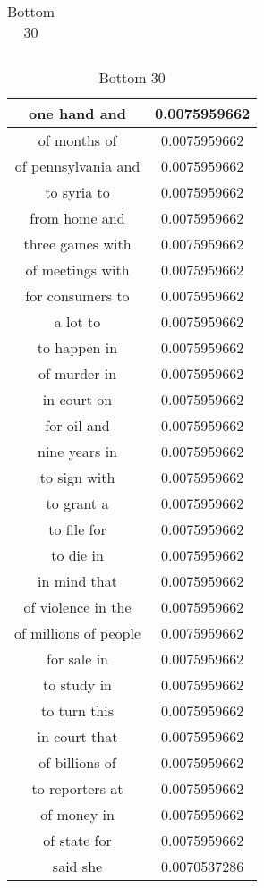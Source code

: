 \documentclass{article}
\begin{document}
\begin{table}[ht]
{\begin{tabular}{|c|c|}
\hline
\end{tabular}
\caption{Mid 30}
}
\hfill
\parbox{.23\linewidth}{
\centering
\begin{tabular}{|c|c|}
\hline
one hand and & 0.0075959662\\
\hline
of months of & 0.0075959662\\
\hline
of pennsylvania and & 0.0075959662\\
\hline
to syria to & 0.0075959662\\
\hline
from home and & 0.0075959662\\
\hline
three games with & 0.0075959662\\
\hline
of meetings with & 0.0075959662\\
\hline
for consumers to & 0.0075959662\\
\hline
a lot to & 0.0075959662\\
\hline
to happen in & 0.0075959662\\
\hline
of murder in & 0.0075959662\\
\hline
in court on & 0.0075959662\\
\hline
for oil and & 0.0075959662\\
\hline
nine years in & 0.0075959662\\
\hline
to sign with & 0.0075959662\\
\hline
to grant a & 0.0075959662\\
\hline
to file for & 0.0075959662\\
\hline
to die in & 0.0075959662\\
\hline
in mind that & 0.0075959662\\
\hline
of violence in the & 0.0075959662\\
\hline
of millions of people & 0.0075959662\\
\hline
for sale in & 0.0075959662\\
\hline
to study in & 0.0075959662\\
\hline
to turn this & 0.0075959662\\
\hline
in court that & 0.0075959662\\
\hline
of billions of & 0.0075959662\\
\hline
to reporters at & 0.0075959662\\
\hline
of money in & 0.0075959662\\
\hline
of state for & 0.0075959662\\
\hline
said she & 0.0070537286\\
\hline
\end{tabular}
\caption{Bottom 30}
}
\end{table}
\end{document}
